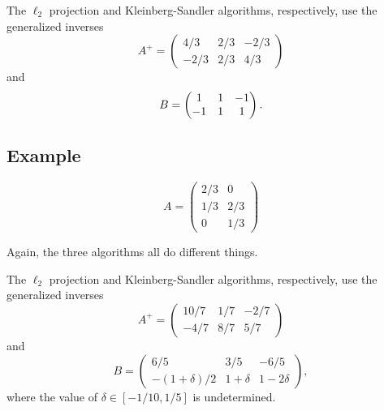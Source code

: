 \documentclass{article}
\begin{document}
The \(\ell_2\) projection and Kleinberg-Sandler algorithms, respectively, use the generalized inverses
\[
    A^+ =
    \begin{pmatrix}
         4/3 & 2/3 & -2/3
    \\  -2/3 & 2/3 &  4/3
    \end{pmatrix}
\]
    and
\[
    B =
    \begin{pmatrix}
         1 & 1 & -1
    \\  -1 & 1 &  1
    \end{pmatrix}
    \ldotp
\]

\subsection{Example}

\[
    A =
    \begin{pmatrix}
        2/3 & 0
    \\  1/3 & 2/3
    \\  0   & 1/3
    \end{pmatrix}
\]

Again, the three algorithms all do different things.

The \(\ell_2\) projection and Kleinberg-Sandler algorithms, respectively, use the generalized inverses
\[
    A^+ =
    \begin{pmatrix}
        10/7 & 1/7 & -2/7
    \\  -4/7 & 8/7 &  5/7
    \end{pmatrix}
\]
    and
\[
    B =
    \begin{pmatrix}
        6/5               & 3/5        & -6/5
    \\  -(1 + \delta) / 2 & 1 + \delta & 1 - 2 \delta
    \end{pmatrix}
    ,
\]
where the value of \(\delta \in [-1/10, 1/5]\) is undetermined.
\end{document}
